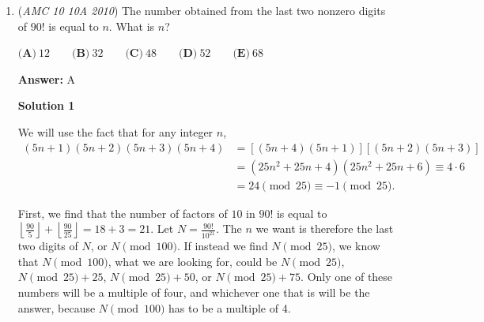 \begin{enumerate}
 To stop after drawing $n$ marbles, we must draw a white marble from boxes $1, 2, \ldots, n-1,$ and draw a red marble from box $n.$ Thus, 
 \[P(n) = \left(\frac{1}{2} \cdot \frac{2}{3} \cdot \frac{3}{4} \cdots \frac {n - 1}{n}\right) \cdot \frac{1}{n +1} = \frac{1}{n (n + 1)}.\]

 So, we must have $\frac{1}{n(n + 1)} < \frac{1}{2010}$ or $n(n+1) > 2010.$

 Since $n(n+1)$ increases as $n$ increases, we can simply test values of $n$; after some trial and error, we get that the minimum value of $n$ is $\boxed{\textbf{(A) }45}$, since $45(46) = 2070$ but $44(45) = 1980.$




\textbf{Solution 2(cheap)}

Do the same thing as Solution 1, but when we get to $n(n+1)>2010$ just test all the answer choices in ascending order(from A to E), and stop when one of the answer choices is greater than $2010$. We get $45(46)=2070$, which is greater than $2010$, so we are done. The answer is $\textbf{(A)}$

 -vsamc

 



\textbf{Solution 3(very cheap)}

Do the same thing as Solution 1, but when we get to $n(n+1)>2010$, remember that in our current era, the square root of the year is in the 40s. $n(n+1)$ is close to $n^2$, so only $\textbf{(A)}$ can be correct.

 


	\item (\textit{AMC 10 10A 2010}) The number obtained from the last two nonzero digits of $90!$ is equal to $n$. What is $n$?


 $\textbf{(A)}\ 12 \qquad \textbf{(B)}\ 32 \qquad \textbf{(C)}\ 48 \qquad \textbf{(D)}\ 52 \qquad \textbf{(E)}\ 68$

 \textbf{Answer: }A



\textbf{Solution 1}

We will use the fact that for any integer $n$,
 \begin{align*}(5n+1)(5n+2)(5n+3)(5n+4)&=[(5n+4)(5n+1)][(5n+2)(5n+3)]\\ &=(25n^2+25n+4)(25n^2+25n+6)\equiv 4\cdot 6\\ &=24\pmod{25}\equiv -1\pmod{25}.\end{align*}


 First, we find that the number of factors of $10$ in $90!$ is equal to $\left\lfloor \frac{90}5\right\rfloor+\left\lfloor\frac{90}{25}\right\rfloor=18+3=21$. Let $N=\frac{90!}{10^{21}}$. The $n$ we want is therefore the last two digits of $N$, or $N\pmod{100}$. If instead we find $N\pmod{25}$, we know that $N\pmod{100}$, what we are looking for, could be $N\pmod{25}$, $N\pmod{25}+25$, $N\pmod{25}+50$, or $N\pmod{25}+75$. Only one of these numbers will be a multiple of four, and whichever one that is will be the answer, because $N\pmod{100}$ has to be a multiple of 4.


\end{enumerate}
